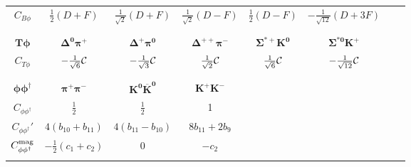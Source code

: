 \documentclass[preprintnumbers,prd,superscriptaddress,preprint]{revtex4-1}
\begin{document}
\begin{table}[b]
\begin{center}
{\begin{tabular}{c|ccccccc}
\hspace*{0.1cm}$C_{B\phi}$\hspace*{0.1cm}
& \hspace*{0.1cm}$\frac12 (D+F)$\hspace*{0.1cm}
& \hspace*{0.1cm}$\frac{1}{\sqrt2} (D+F)$\hspace*{0.1cm}
& \hspace*{0.1cm}$\frac{1}{\sqrt2} (D-F)$\hspace*{0.1cm}
& \hspace*{0.1cm}$\frac12 (D-F)$\hspace*{0.1cm}
& \hspace*{0.1cm}$-\frac{1}{\sqrt{12}} (D+3F)$\hspace*{0.1cm} 
\\ 
&&&&&&& \\
\hline
&&&&&&& \\
$\bm{T\phi}$
& $\bm{\Delta^0 \pi^+}$
& $\bm{\Delta^+ \pi^0}$
& $\bm{\Delta^{++} \pi^-}$
& $\bm{\Sigma^{*+} K^0}$
& $\bm{\Sigma^{*0} K^+}$				
\\
$C_{T\phi}$
& $-\frac{1}{\sqrt 6} {\cal C}$
& $-\frac{1}{\sqrt 3} {\cal C}$
& $\frac{1}{\sqrt 2} {\cal C}$
& $\frac{1}{\sqrt 6} {\cal C}$
& $-\frac{1}{\sqrt {12}} {\cal C}$
\\ 
&&&&&&& \\
\hline
&&&&&&& \\
$\bm{\phi\phi^\dag}$
& $\bm{\pi^+\pi^-}$
& $\bm{K^0 \overline{K}^0}$
& $\bm{K^+ K^-}$
&
&						\\
%
$C_{\phi\phi^\dag}$
& $\frac{1}{2}$
& $\frac{1}{2}$
& 1
&
&						\\
$C_{\phi\phi^\dag}'$
& $4(b_{10}+b_{11})$
& $4(b_{11}-b_{10})$
& $8b_{11}+2b_{9}$
&
&						\\
$C_{\phi\phi^\dag}^{\rm mag}$
& $-\frac{1}{2}(c_1+c_2)$
& $0$
& $-c_2$
&
&						\\
&&&&&&& \\
\hline
\end{tabular}
}
\label{tab:C}
\end{center}
\end{table}
\end{document}
